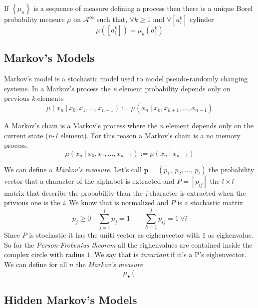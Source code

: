 \begin{theorem}
    If $\left\{\mu_n\right\}$ is a sequence of measure defining a process then there is a unique Borel probability measure $\mu$ on $\mathcal{A}^\infty$ such that, $\forall k \geq 1$ and $\forall \left[a_1^k\right]$ cylinder
    \begin{equation*}
        \mu\left(\left[a_1^k\right]\right) = \mu_k\left(a_1^k\right)
    \end{equation*}
\end{theorem}

\subsection{Markov's Models}
Markov's model is a stochastic model used to model pseudo-randomly changing systems. In a Markov's process the \emph{n} element probability depends only on previous \emph{k}-elements
\begin{equation}
\mu\left(x_{n}\ \vert\ x_{0}, x_{1}, \dots, x_{n-1}\right):=\mu\left(x_{n}\ \vert\ x_{k}, x_{k+1}, \dots, x_{n-1}\right)
\end{equation}

A Markov's chain is a Markov's process where the \emph{n} element depends only on the current state (\emph{n-1} element). For this reason a Markov's chain is a no memory process.
\begin{equation}
\mu\left(x_{n}\ \vert\ x_{0}, x_{1}, \dots, x_{n-1}\right):=\mu\left(x_{n}\ \vert\ x_{n-1}\right)
\end{equation}

We can define a \emph{Markov's measure}. Let's call $\mathbf{p}=\left(p_{1},\ p_{2},\dots ,\ p_{l}\right)$ the probability vector that a character of the alphabet  is extracted and $P=\left[p_{ij}\right]$ the $l\times l$ matrix that describe the probability than the \emph{j} character is extracted when the privious one is the \emph{i}. We know that  is normalized and $P$ is a stochastic matrix
\[p_{j}\geq 0\quad \sum_{j=1}^{l}p_{j}=1\qquad\sum_{h=1}^{j}p_{ij}=1\ \forall i\]
Since $P$ is stochastic it has the uniti vector as eighenvector with $1$ as eighenvalue. So for the \emph{Person-Frobenius theorem} all the eighenvalues are contained inside the complex circle with radius $1$.
We say that  is \emph{invariant} if it's a P's eighenvector. We can define for all $n$ the \emph{Markov's measure}
\begin{equation}
\mu_{•}\left(
\end{equation}


\subsection{Hidden Markov's Models}